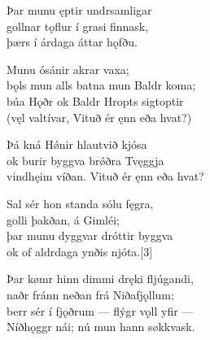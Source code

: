 \bva Þar munu ęptir \hld undrsamligar \\
gollnar tǫflur \hld í grasi finnask, \\
þærs í árdaga \hld áttar hǫfðu.

\bva Munu ósánir \hld akrar vaxa; \\
bǫls mun alls batna \hld mun Baldr koma; \\
búa Hǫðr ok Baldr \hld Hropts sigtoptir \\
(vęl valtívar, \hld Vituð ér ęnn eða hvat?)

\bva Þá kná Hǿnir \hld hlautvið kjósa \\
ok burir byggva \hld brǿðra Tvęggja \\
vindhęim víðan. \hld Vituð ér ęnn eða hvat?

\bva Sal sér hon standa \hld sólu fęgra, \\
golli þakðan, \hld á Gimléi; \\
þar munu dyggvar \hld dróttir byggva \\
ok of aldrdaga \hld ynðis njóta.[3]

\bva Þar kømr hinn dimmi \hld dręki fljúgandi, \\
naðr fránn neðan \hld frá Niðafjǫllum; \\
berr sér í fjǫðrum \hld — flýgr vǫll yfir — \\
Níðhǫggr nái; \hld nú mun hann søkkvask.

